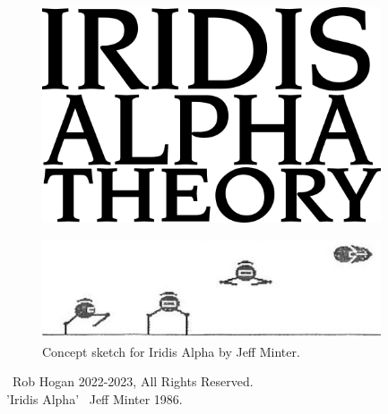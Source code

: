 
\vspace*{\fill}
\begin{figure}[H]
    \centering
      \includegraphics[width=10cm]{src/cover/title_page.png}%
\end{figure}
\vspace*{\fill}
\thispagestyle{empty}%

\clearpage
\vspace*{\fill}
\begin{figure}[H]
    \centering
      \includegraphics[width=10cm]{src/bumph/sketch.png}%
\caption*{Concept sketch for Iridis Alpha by Jeff Minter.}
\end{figure}

\vspace*{\fill}
\textcopyright\ Rob Hogan 2022-2023, All Rights Reserved. \\
'Iridis Alpha' \textcopyright\ Jeff Minter 1986.

\doclicenseThis
\thispagestyle{empty}%
\clearpage
